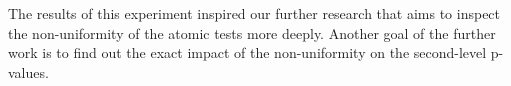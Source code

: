 \documentclass[
  digital,  	%
  color,		%
  oneside,   	%
  12pt,
  nocover,
  notable,
  nolof,
  nolot,
]{fithesis3}
\theoremstyle{definition}
\theoremstyle{remark}
\begin{document}
The results of this experiment inspired our further research that aims to inspect the non-uniformity of the atomic tests more deeply. Another goal of the further work is to find out the exact impact of the non-uniformity on the second-level p-values.
\end{document}
